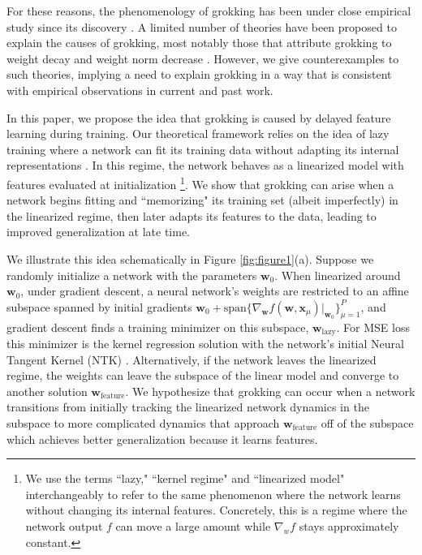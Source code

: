 \documentclass{article} %
\def\w{\bm w}
\def\x{\bm x}
\begin{document}
For these reasons, the phenomenology of grokking has been under close empirical study since its discovery \citep{nanda2023progress, davies2023unifying, thilak2022slingshot, varma2023explaining, liu2022omnigrok, liu2022towards, gromov2023grokking}. A limited number of theories have been proposed to explain the causes of grokking, most notably those that attribute grokking to weight decay and weight norm decrease \citep{liu2022omnigrok, varma2023explaining}. However, we give counterexamples to such theories, implying a need to explain grokking in a way that is consistent with empirical observations in current and past work. 



In this paper, we propose the idea that grokking is caused by delayed feature learning during training. Our theoretical framework relies on the idea of lazy training where a network can fit its training data without adapting its internal representations \citep{chizat2019lazy}. 
In this regime, the network behaves as a linearized model with features evaluated at initialization \citep{jacot2018neural,chizat2019lazy, lee2019wide}\footnote{We use the terms ``lazy," ``kernel regime" and ``linearized model" interchangeably to refer to the same phenomenon where the network learns without changing its internal features. Concretely, this is a regime where the network output $f$ can move a large amount while $\nabla_w f$ stays approximately constant.}.  We show that grokking can arise when a network begins fitting and ``memorizing" its training set (albeit imperfectly) in the linearized regime, then later adapts its features to the data, leading to improved generalization at late time. 

We illustrate this idea schematically in Figure \ref{fig:figure1}(a). Suppose we randomly initialize a network with the parameters $\bm{w}_0$. When linearized around $\w_0$, under gradient descent, a neural network's weights are restricted to an affine subspace spanned by initial gradients $\w_0 + \text{span}\{\nabla_{\w} f(\w,\x_\mu)|_{\w_0} \}_{\mu=1}^P$, and gradient descent finds a training minimizer on this subspace, $\w_{\text{lazy}}$. For MSE loss this minimizer is the kernel regression solution with the network's initial Neural Tangent Kernel (NTK) \citep{jacot2018neural, lee2019wide}. Alternatively, if the network leaves the linearized regime, the weights can leave the subspace of the linear model and converge to another solution $\w_{\text{feature}}$. We hypothesize that grokking can occur when a network transitions from initially tracking the linearized network dynamics in the subspace to more complicated dynamics that approach $\w_{\text{feature}}$ off of the subspace which achieves better generalization because it learns features.
\end{document}
